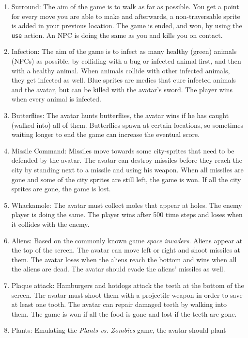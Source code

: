 \begin{enumerate}
	\item Surround: 
		The aim of the game is to walk as far as possible. You get a point for
		every move you are able to make and afterwards, a non-traversable sprite
		is added in your previous location. The game is ended, and won, by using
		the \texttt{use} action. An NPC is doing the same as you and kills you
		on contact.
	\item Infection:
		The aim of the game is to infect as many healthy (green) animals (NPCs)
		as possible, by colliding with a bug or infected animal first, and then
		with a healthy animal. When animals collide with other infected animals,
		they get infected as well. Blue sprites are medics that cure infected
		animals and the avatar, but can be killed with the avatar's sword. The
		player wins when every animal is infected.
	\item Butterflies: 
		The avatar hunts butterflies, the avatar wins if he has caught (walked
		into) all of them. Butterflies spawn at certain locations, so sometimes
		waiting longer to end the game can increase the eventual score.
	\item Missile Command: 
		Missiles move towards some city-sprites that need to be defended by the
		avatar. The avatar can destroy missiles before they reach the city by
		standing next to a missile and using his weapon. When all missiles are
		gone and some of the city sprites are still left, the game is won. If
		all the city sprites are gone, the game is lost.
	\item Whackamole:
		The avatar must collect moles that appear at holes. The enemy player is
		doing the same. The player wins after 500 time steps and loses when it
		collides with the enemy.
	\item Aliens:
		Based on the commonly known game \textit{space invaders}. Aliens appear
		at the top of the screen. The avatar can move left or right and shoot
		missiles at them. The avatar loses when the aliens reach the bottom and
		wins when all the aliens are dead. The avatar should evade the aliens'
		missiles as well.
	\item Plaque attack:
		Hamburgers and hotdogs attack the teeth at the bottom of the screen. The
		avatar must shoot them with a projectile weapon in order to save at
		least one tooth. The avatar can repair damaged teeth by walking into
		them. The game is won if all the food is gone and lost if the teeth are
		gone.
	\item Plants:
		Emulating the \textit{Plants vs. Zombies} game, the avatar should plant

\end{enumerate}
